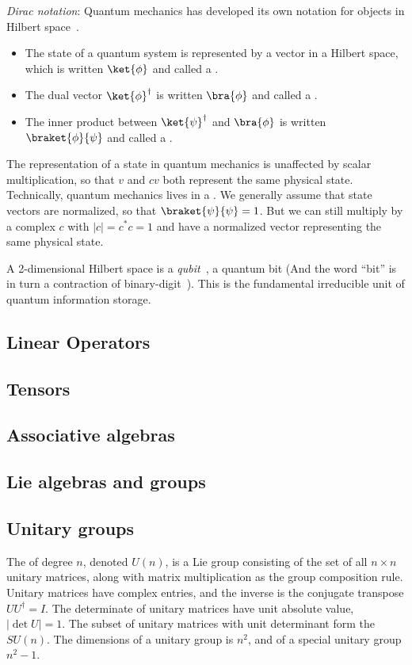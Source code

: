 {\sl Dirac notation}: Quantum mechanics has developed its own notation for objects in Hilbert space~\cite{Dirac???}. 
 \begin{itemize}
 \item The state of a quantum system is represented by a vector in a Hilbert space, which is written $\ket{\phi}$ and called a .
  \item The dual vector $\ket{\phi}^\dagger$  is written $\bra{\phi}$ and called a .
  \item The inner product between $\ket{\psi}^\dagger$ and $\bra{\phi}$ is written $\braket{\phi}{\psi}$ and called a . 
 \end{itemize}
The representation of a state in quantum mechanics is unaffected by scalar multiplication, so that $v$ and $cv$ both represent the same physical state. Technically, quantum mechanics  lives in a . We generally assume that state vectors are normalized, so that $\braket{\psi}{\psi}=1$. But we can still multiply by a complex  $c$ with $|c| = c^*c = 1$ and have a  normalized vector representing the same physical state.  

A 2-dimensional Hilbert space is a {\sl qubit}~\cite{???}, a quantum bit (And the word ``bit'' is in turn a contraction of binary-digit~\cite{???}). This is the fundamental irreducible unit of quantum information storage.


\subsection{Linear Operators}


\subsection{Tensors}


\subsection{Associative algebras}



\subsection{Lie algebras and groups}



\subsection{Unitary groups}
The  of degree $n$, denoted $U(n)$, is a Lie group consisting of the set of all $n\times n$ unitary matrices, along with  matrix multiplication as the group composition rule. Unitary matrices have complex entries, and the inverse is the conjugate transpose $UU^\dagger=I$. The determinate of unitary matrices have unit absolute value, $|\det U|=1$. The subset of unitary matrices with unit determinant form the  $SU(n)$. The dimensions of a unitary group is $n^2$, and of a special unitary group $n^2-1$.


